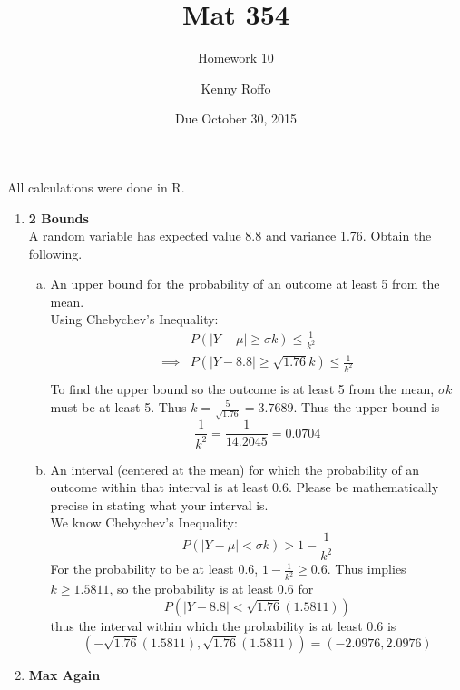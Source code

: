 \documentclass{scrartcl}
\title{Mat 354}
\subtitle{Homework 10}
\author{Kenny Roffo}
\date{Due October 30, 2015}
\begin{document}
\maketitle

All calculations were done in R.

\begin{enumerate}

\item \textbf{2 Bounds}\\

A random variable has expected value 8.8 and variance 1.76. Obtain the following.

\begin{enumerate}[a)]
\item An upper bound for the probability of an outcome at least 5 from the mean.\\

Using Chebychev's Inequality:
\begin{align*}
  &P(|Y-\mu| \ge \sigma k) \le \frac{1}{k^2}\\
  \implies &P(|Y-8.8| \ge \sqrt{1.76}k)  \le \frac{1}{k^2}\\
\end{align*}
To find the upper bound so the outcome is at least 5 from the mean, $\sigma k$ must be at least 5. Thus $k=\frac{5}{\sqrt{1.76}}=3.7689$. Thus the upper bound is $$\frac{1}{k^2} = \frac{1}{14.2045} = 0.0704 $$

\item An interval (centered at the mean) for which the probability of an outcome within that interval is at least 0.6. Please be mathematically precise in stating what your interval is.\\

We know Chebychev's Inequality: $$P(|Y-\mu| < \sigma k) > 1 - \frac{1}{k^2}$$ For the probability to be at least 0.6, $1 - \frac{1}{k^2} \ge 0.6$. Thus implies $k \ge 1.5811$, so the probability is at least 0.6 for $$P(|Y-8.8| < \sqrt{1.76}(1.5811))$$ thus the interval within which the probability is at least 0.6 is $$(-\sqrt{1.76}(1.5811),\sqrt{1.76}(1.5811)) = (-2.0976,2.0976)$$

\end{enumerate}

\item \textbf{Max Again}


\end{enumerate}
\end{document}

